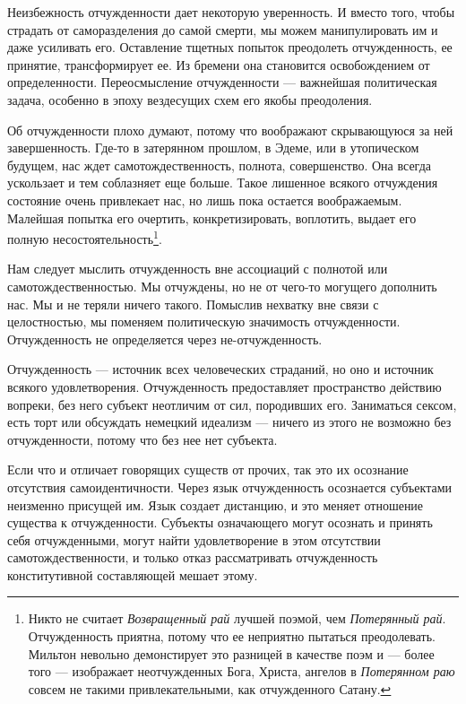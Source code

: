 \documentclass[12pt]{book}
\begin{document}
Неизбежность отчужденности дает некоторую уверенность. И вместо того, чтобы страдать от саморазделения до самой смерти, мы можем манипулировать им и даже усиливать его. Оставление тщетных попыток преодолеть отчужденность, ее принятие, трансформирует ее. Из бремени она становится освобождением от определенности. Переосмысление отчужденности --- важнейшая политическая задача, особенно в эпоху вездесущих схем его якобы преодоления.

Об отчужденности плохо думают, потому что воображают скрывающуюся за ней завершенность. Где-то в затерянном прошлом, в Эдеме, или в утопическом будущем, нас ждет самотождественность, полнота, совершенство. Она всегда ускользает и тем соблазняет еще больше. Такое лишенное всякого отчуждения состояние очень привлекает нас, но лишь пока остается воображаемым. Малейшая попытка его очертить, конкретизировать, воплотить, выдает его полную несостоятельность\footnote{Никто не считает \textit{Возвращенный рай} лучшей поэмой, чем \textit{Потерянный рай}. Отчужденность приятна, потому что ее неприятно пытаться преодолевать. Мильтон невольно демонстирует это разницей в качестве поэм и --- более того --- изображает неотчужденных Бога, Христа, ангелов в \textit{Потерянном раю} совсем не такими привлекательными, как отчужденного Сатану.}.

Нам следует мыслить отчужденность вне ассоциаций с полнотой или самотождественностью. Мы отчуждены, но не от чего-то могущего дополнить нас. Мы и не теряли ничего такого. Помыслив нехватку вне связи с целостностью, мы поменяем политическую значимость отчужденности. Отчужденность не определяется через не-отчужденность.

Отчужденность --- источник всех человеческих страданий, но оно и источник всякого удовлетворения. Отчужденность предоставляет пространство действию вопреки, без него субъект неотличим от сил, породивших его. Заниматься сексом, есть торт или обсуждать немецкий идеализм --- ничего из этого не возможно без отчужденности, потому что без нее нет субъекта.

Если что и отличает говорящих существ от прочих, так это их осознание отсутствия самоидентичности. Через язык отчужденность осознается субъектами неизменно присущей им. Язык создает дистанцию, и это меняет отношение существа к отчужденности. Субъекты означающего могут осознать и принять себя отчужденными, могут найти удовлетворение в этом отсутствии самотождественности, и только отказ рассматривать отчужденность конститутивной составляющей мешает этому.
\end{document}
